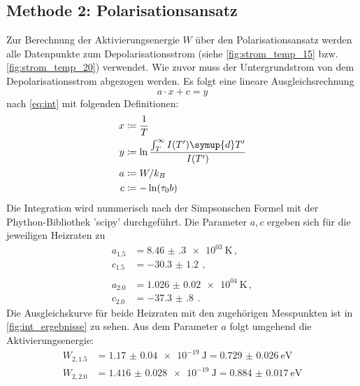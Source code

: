 \subsection{Methode 2: Polarisationsansatz}
Zur Berechnung der Aktivierungsenergie $W$ über den Polarisationsansatz werden alle Datenpunkte zum Depolarisationsstrom (siehe \autoref{fig:strom_temp_15} bzw. \autoref{fig:strom_temp_20}) verwendet.
Wie zuvor muss der Untergrundstrom von dem Depolarisationsstrom abgezogen werden.
Es folgt eine lineare Ausgleichsrechnung
\begin{equation*}
    a \cdot x + c = y
\end{equation*}
nach \autoref{eq:int} mit folgenden Definitionen:
\begin{align*}
    x &\coloneqq \frac{1}{T} \\
    y &\coloneqq \ln \frac{ \int_{T}^{\infty} I(T')\symup{d}T'}{I(T')} \\
    a &\coloneqq W/k_B \\
    c &\coloneqq -\ln (\tau_0 b)
\end{align*}
Die Integration wird nummerisch nach der Simpsonschen Formel mit der Phython-Bibliothek 'scipy'\cite{scipy} durchgeführt.
Die Parameter $a, c$ ergeben sich für die jeweiligen Heizraten zu
\begin{align*}
    a_{1.5} &= \SI{8.46(30)e+03}{\kelvin} \, ,\\
    c_{1.5} &= \SI{-30.3(12)}{} \, , \\
    \\
    a_{2.0} &= \SI{1.026(20)e+04}{\kelvin} \, , \\
    c_{2.0} &= \SI{-37.3(8)}{} \, .
\end{align*}
Die Ausgleichskurve für beide Heizraten mit den zugehörigen Messpunkten ist in \autoref{fig:int_ergebnisse} zu sehen.
Aus dem Parameter $a$ folgt umgehend die Aktivierungsenergie:
\begin{align*}
    W_{2, 1.5} &= \SI{1.17(4)e-19}{\joule} = \SI{0.729(26)}{\electronvolt} \\
    W_{2, 2.0} &= \SI{1.416(28)e-19}{\joule} = \SI{0.884(17)}{\electronvolt} \\
\end{align*}

